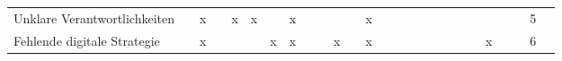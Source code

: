 \begin{sidewaystable}[ht]
\begin{tabular}{|p{6cm}|c|c|c|c|c|c|c|c|c|c|c|c|c|c|c|c|c|c|c|c|c|c|c|c|c|}
		Unklare Verantwortlichkeiten                    &                   & x                  &                    & x                    & x                  &                   & x                 &                      &                    &                      &                  & x                &                     &                  &                 &                      &                    &                 &                  &                  &                        &                      &                        & 5  \\
		Fehlende digitale Strategie                     &                   & x                  &                    &                      &                    & x                 & x                 &                      &                    & x                    &                  & x                &                     &                  &                 &                      &                    &                 &                  &                  & x                      &                      &                        & 6 \\
		\hline
	\end{tabular}
	\label{tab:clusteringproblemfields}
\end{sidewaystable}

